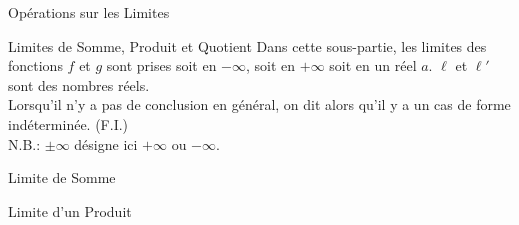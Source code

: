 \documentclass{coursbook}
\begin{document}
    \begin{Gpartie}{Opérations sur les Limites} 
        \begin{Spartie}{Limites de Somme, Produit et Quotient} 
            Dans cette sous-partie, les limites des fonctions $f$ et $g$ sont prises soit en $-\infty$, soit en $+\infty$ soit en un réel $a$. $\ell$ et $\ell'$ sont des nombres réels. \\ Lorsqu'il n'y a pas de conclusion en général, on dit alors qu'il y a un cas de forme indéterminée. (F.I.) \\
            N.B.: $\pm\infty$ désigne ici $+\infty$ ou $-\infty$.
            \begin{SSpartie}{Limite de Somme} 
                \vspace{-2ex}
                \begin{table}[H]
                    \centering {}
                \end{table}
            \end{SSpartie}
            \begin{SSpartie}{Limite d'un Produit} 
                

\end{SSpartie}
\end{Spartie}
\end{Gpartie}
\end{document}
